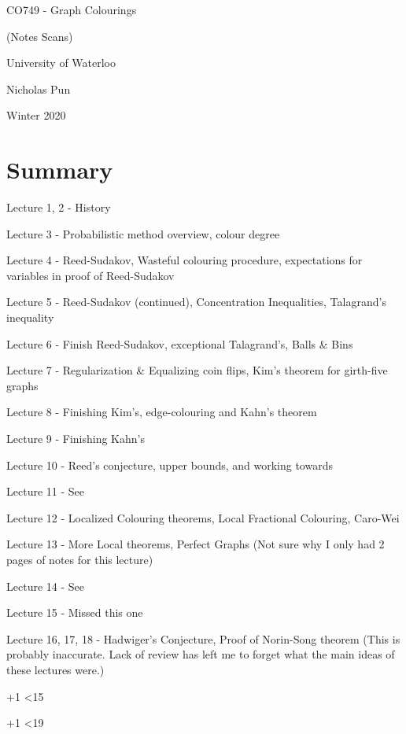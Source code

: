 \documentclass[12pt]{article}
\newcommand{\includelecture}[1]{
  
  
  \clearpage
}
\begin{document}
\begin{titlepage}
  \centering
  \vspace*{2in}
  {\huge CO749 - Graph Colourings}\par
  {\Large (Notes Scans)}\par
  \vspace{0.3in}
  {\large University of Waterloo}\par
  {\large Nicholas Pun}\par
  {\large Winter 2020}\par 
\end{titlepage}
 
\tableofcontents
\clearpage

\section*{Summary}
Lecture 1, 2 - History

Lecture 3 - Probabilistic method overview, colour degree

Lecture 4 - Reed-Sudakov, Wasteful colouring procedure, expectations for variables in proof of Reed-Sudakov

Lecture 5 - Reed-Sudakov (continued), Concentration Inequalities, Talagrand's inequality

Lecture 6 - Finish Reed-Sudakov, exceptional Talagrand's, Balls \& Bins

Lecture 7 - Regularization \& Equalizing coin flips, Kim's theorem for girth-five graphs

Lecture 8 - Finishing Kim's, edge-colouring and Kahn's theorem

Lecture 9 - Finishing Kahn's

Lecture 10 - Reed's conjecture, upper bounds, and working towards \cite{1911.02672} 

Lecture 11 - See \cite{1810.06704,1803.01051}

Lecture 12 - Localized Colouring theorems, Local Fractional Colouring, Caro-Wei

Lecture 13 - More Local theorems, Perfect Graphs (Not sure why I only had 2 pages of notes for this lecture)

Lecture 14 - See \cite{1811.11806}

Lecture 15 - Missed this one

Lecture 16, 17, 18 - Hadwiger's Conjecture, Proof of Norin-Song theorem
(This is probably inaccurate.
Lack of review has left me to forget what the main ideas of these lectures were.) 

\clearpage

\newcount\lecNum
{}
\loop
  \includelecture{sections/lec\the\lecNum.pdf}
  \advance \lecNum +1
\ifnum \lecNum<15
\repeat


\loop
  \includelecture{sections/lec\the\lecNum.pdf}
  \advance \lecNum +1
\ifnum \lecNum<19
\repeat


\nocite{*}


\end{document}
